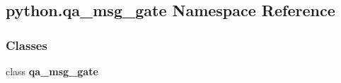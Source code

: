 \subsection{python.\+qa\+\_\+msg\+\_\+gate Namespace Reference}
\label{namespacepython_1_1qa__msg__gate}
\subsubsection*{Classes}
\begin{DoxyCompactItemize}
\item 
class {\bf qa\+\_\+msg\+\_\+gate}
\end{DoxyCompactItemize}
